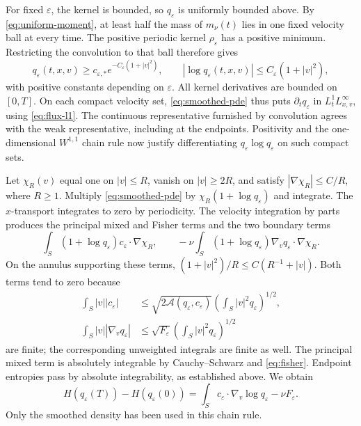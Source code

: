 \documentclass[11pt]{article}
\newcommand{\A}{\mathcal A}
\begin{document}
For fixed $\varepsilon$, the kernel is bounded, so $q_\varepsilon$
is uniformly bounded above. By \eqref{eq:uniform-moment}, at least half
the mass of $m_\nu(t)$ lies in one fixed velocity ball at every time.
The positive periodic kernel $\rho_\varepsilon$ has a positive minimum.
Restricting the convolution to that ball therefore gives
\begin{equation}\label{eq:log}
 q_\varepsilon(t,x,v)\geq
 c_{\varepsilon,*}e^{-C_\varepsilon(1+|v|^2)},\qquad
 |\log q_\varepsilon(t,x,v)|\leq C_\varepsilon(1+|v|^2),
\end{equation}
with positive constants depending on $\varepsilon$.
All kernel derivatives are bounded on $[0,T]$.
On each compact velocity set, \eqref{eq:smoothed-pde} thus puts
$\partial_tq_\varepsilon$ in $L^1_tL^\infty_{x,v}$, using
\eqref{eq:flux-l1}. The continuous representative furnished by convolution
agrees with the weak representative, including at the endpoints.
Positivity and the one-dimensional $W^{1,1}$ chain rule
\cite[Section~8.2]{Brezis} now justify differentiating
$q_\varepsilon\log q_\varepsilon$ on such compact sets.

Let $\chi_R(v)$ equal one on $|v|\leq R$, vanish on $|v|\geq2R$,
and satisfy $|\nabla\chi_R|\leq C/R$, where $R\geq1$.
Multiply \eqref{eq:smoothed-pde} by
$\chi_R(1+\log q_\varepsilon)$ and integrate.
The $x$-transport integrates to zero by periodicity.
The velocity integration by parts produces the principal mixed and Fisher
terms and the two boundary terms
\[
 \int_S(1+\log q_\varepsilon)c_\varepsilon\cdot\nabla\chi_R,\qquad
 -\nu\int_S(1+\log q_\varepsilon)
                  \nabla_vq_\varepsilon\cdot\nabla\chi_R.
\]
On the annulus supporting these terms,
$(1+|v|^2)/R\leq C(R^{-1}+|v|)$.
Both terms tend to zero because
\[
 \begin{split}
 \int_S|v||c_\varepsilon|
 &\leq\sqrt{2\A(q_\varepsilon,c_\varepsilon)}
            \left(\int_S|v|^2q_\varepsilon\right)^{1/2},\\
 \int_S|v||\nabla_vq_\varepsilon|
 &\leq\sqrt{F_\varepsilon}
            \left(\int_S|v|^2q_\varepsilon\right)^{1/2}
 \end{split}
\]
are finite; the corresponding unweighted integrals are finite as well.
The principal mixed term is absolutely integrable by
Cauchy--Schwarz and \eqref{eq:fisher}. Endpoint entropies pass by absolute
integrability, as established above. We obtain
\begin{equation}\label{eq:entropy-identity}
 H(q_\varepsilon(T))-H(q_\varepsilon(0))
 =\int_S c_\varepsilon\cdot\nabla_v\log q_\varepsilon
 -\nu F_\varepsilon .
\end{equation}
Only the smoothed density has been used in this chain rule.
\end{document}
